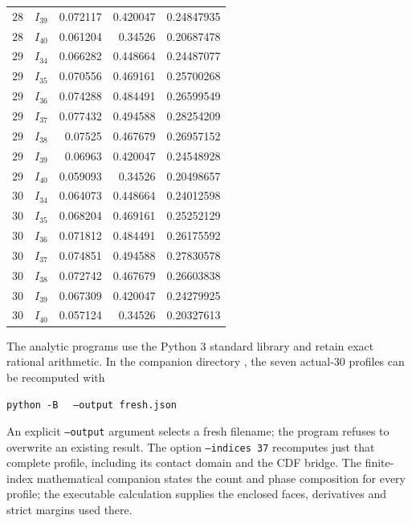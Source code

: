 \begin{longtable}{ccrrr}
$28$ & $I_{39}$ & 0.072117 & 0.420047 & 0.24847935\\
$28$ & $I_{40}$ & 0.061204 & 0.34526 & 0.20687478\\
\addlinespace
$29$ & $I_{34}$ & 0.066282 & 0.448664 & 0.24487077\\
$29$ & $I_{35}$ & 0.070556 & 0.469161 & 0.25700268\\
$29$ & $I_{36}$ & 0.074288 & 0.484491 & 0.26599549\\
$29$ & $I_{37}$ & 0.077432 & 0.494588 & 0.28254209\\
$29$ & $I_{38}$ & 0.07525 & 0.467679 & 0.26957152\\
$29$ & $I_{39}$ & 0.06963 & 0.420047 & 0.24548928\\
$29$ & $I_{40}$ & 0.059093 & 0.34526 & 0.20498657\\
\addlinespace
$30$ & $I_{34}$ & 0.064073 & 0.448664 & 0.24012598\\
$30$ & $I_{35}$ & 0.068204 & 0.469161 & 0.25252129\\
$30$ & $I_{36}$ & 0.071812 & 0.484491 & 0.26175592\\
$30$ & $I_{37}$ & 0.074851 & 0.494588 & 0.27830578\\
$30$ & $I_{38}$ & 0.072742 & 0.467679 & 0.26603838\\
$30$ & $I_{39}$ & 0.067309 & 0.420047 & 0.24279925\\
$30$ & $I_{40}$ & 0.057124 & 0.34526 & 0.20327613\\
\bottomrule\end{longtable}\endgroup
The analytic programs use the Python 3 standard library and retain
exact rational arithmetic. In the companion directory
, the seven actual-$30$
profiles can be recomputed with
\par\noindent\texttt{python -B}\ 
\ \texttt{--output fresh.json}\par
An explicit \texttt{--output} argument selects a fresh filename;
the program refuses to overwrite an existing result.
The option \texttt{--indices 37} recomputes just that complete
profile, including its contact domain and the CDF bridge.
The finite-index mathematical companion states the count and phase
composition for every profile; the executable calculation supplies
the enclosed faces, derivatives and strict margins used there.
